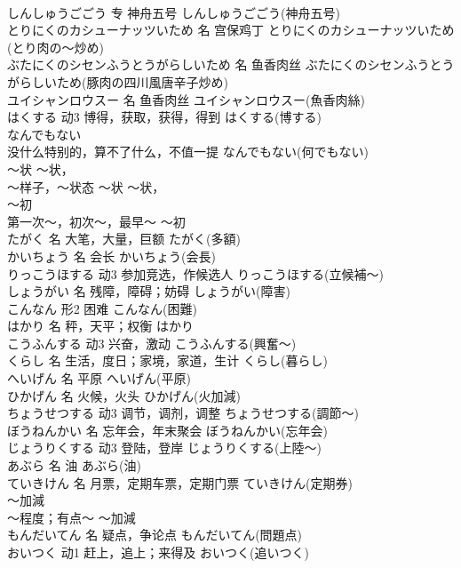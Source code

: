 \documentclass[8pt]{extreport}
\begin{document}
\begin{CJK}{UTF8}{min}
\\	しんしゅうごごう	专	神舟五号	しんしゅうごごう(神舟五号)	
\\	とりにくのカシューナッツいため	名	宫保鸡丁	とりにくのカシューナッツいため(とり肉の～炒め)	
\\	ぶたにくのシセンふうとうがらしいため	名	鱼香肉丝	ぶたにくのシセンふうとうがらしいため(豚肉の四川風唐辛子炒め)	
\\	ユイシャンロウスー	名	鱼香肉丝	ユイシャンロウスー(魚香肉絲)	
\\	はくする	动3	博得，获取，获得，得到	はくする(博する)	
\\	なんでもない	
\\	没什么特别的，算不了什么，不值一提	なんでもない(何でもない)	
\\	～状 ～状，	
\\	～样子，～状态	～状 ～状，	
\\	～初	
\\	第一次～，初次～，最早～	～初	
\\	たがく	名	大笔，大量，巨额	たがく(多額)	
\\	かいちょう	名	会长	かいちょう(会長)	
\\	りっこうほする	动3	参加竞选，作候选人	りっこうほする(立候補～)	
\\	しょうがい	名	残障，障碍；妨碍	しょうがい(障害)	
\\	こんなん	形2	困难	こんなん(困難)	
\\	はかり	名	秤，天平；权衡	はかり	
\\	こうふんする	动3	兴奋，激动	こうふんする(興奮～)	
\\	くらし	名	生活，度日；家境，家道，生计	くらし(暮らし)	
\\	へいげん	名	平原	へいげん(平原)	
\\	ひかげん	名	火候，火头	ひかげん(火加減)	
\\	ちょうせつする	动3	调节，调剂，调整	ちょうせつする(調節～)	
\\	ぼうねんかい	名	忘年会，年末聚会	ぼうねんかい(忘年会)	
\\	じょうりくする	动3	登陆，登岸	じょうりくする(上陸～)	
\\	あぶら	名	油	あぶら(油)	
\\	ていきけん	名	月票，定期车票，定期门票	ていきけん(定期券)	
\\	～加減	
\\	～程度；有点～	～加減	
\\	もんだいてん	名	疑点，争论点	もんだいてん(問題点)	
\\	おいつく	动1	赶上，追上；来得及	おいつく(追いつく)	

\end{CJK}
\end{document}
